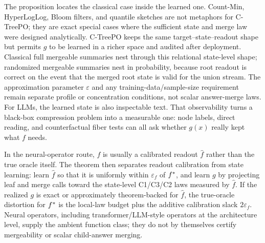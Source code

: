 The proposition locates the classical case inside the learned one. Count-Min,
HyperLogLog, Bloom filters, and quantile sketches are not metaphors for
C-TreePO; they are exact special cases where the sufficient state and merge
law were designed analytically. C-TreePO keeps the same target--state--readout
shape but permits $g$ to be learned in a richer space and audited after
deployment. Classical full mergeable summaries nest through this relational
state-level shape; randomized mergeable summaries nest in probability, because
root readout is correct on the event that the merged root state is valid for
the union stream. The approximation parameter $\varepsilon$ and any
training-data/sample-size requirement remain separate profile or concentration
conditions, not scalar answer-merge laws. For LLMs, the learned state is also
inspectable text. That
observability turns a black-box compression problem into a measurable one:
node labels, direct reading, and counterfactual fiber tests can all ask
whether $g(x)$ really kept what $f$ needs.

In the neural-operator route, $f$ is usually a calibrated readout
$\widehat f$ rather than the true oracle itself. The theorem then separates
readout calibration from state learning: learn $\widehat f$ so that it is
uniformly within $\varepsilon_f$ of $f^\ast$, and learn $g$ by projecting leaf
and merge calls toward the state-level C1/C3/C2 laws measured by
$\widehat f$. If the realized $g$ is exact or approximately theorem-backed
for $\widehat f$, the true-oracle distortion for $f^\ast$ is the local-law
budget plus the additive calibration slack $2\varepsilon_f$. Neural
operators, including transformer/LLM-style operators at the architecture
level, supply the ambient function class; they do not by themselves certify
mergeability or scalar child-answer merging.
